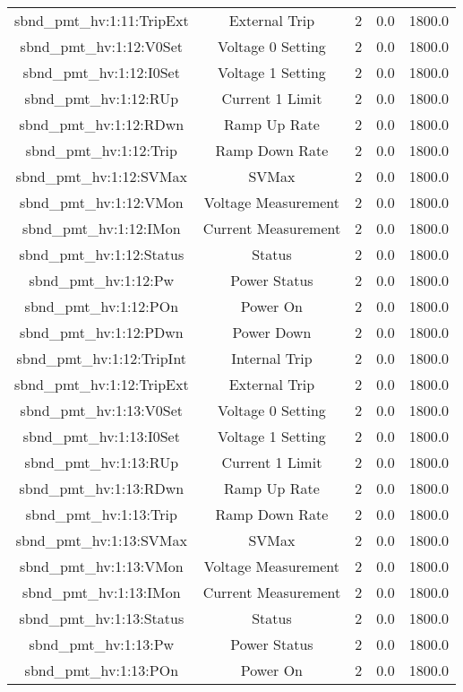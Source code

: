 \begin{center}
\begin{longtable}{c | c c c c }
sbnd\_pmt\_hv:1:11:TripExt & External Trip & 2 & 0.0 & 1800.0\\ 
sbnd\_pmt\_hv:1:12:V0Set & Voltage 0 Setting & 2 & 0.0 & 1800.0\\ 
sbnd\_pmt\_hv:1:12:I0Set & Voltage 1 Setting & 2 & 0.0 & 1800.0\\ 
sbnd\_pmt\_hv:1:12:RUp & Current 1 Limit & 2 & 0.0 & 1800.0\\ 
sbnd\_pmt\_hv:1:12:RDwn & Ramp Up Rate & 2 & 0.0 & 1800.0\\ 
sbnd\_pmt\_hv:1:12:Trip & Ramp Down Rate & 2 & 0.0 & 1800.0\\ 
sbnd\_pmt\_hv:1:12:SVMax & SVMax & 2 & 0.0 & 1800.0\\ 
sbnd\_pmt\_hv:1:12:VMon & Voltage Measurement & 2 & 0.0 & 1800.0\\ 
sbnd\_pmt\_hv:1:12:IMon & Current Measurement & 2 & 0.0 & 1800.0\\ 
sbnd\_pmt\_hv:1:12:Status & Status & 2 & 0.0 & 1800.0\\ 
sbnd\_pmt\_hv:1:12:Pw & Power Status & 2 & 0.0 & 1800.0\\ 
sbnd\_pmt\_hv:1:12:POn & Power On & 2 & 0.0 & 1800.0\\ 
sbnd\_pmt\_hv:1:12:PDwn & Power Down & 2 & 0.0 & 1800.0\\ 
sbnd\_pmt\_hv:1:12:TripInt & Internal Trip & 2 & 0.0 & 1800.0\\ 
sbnd\_pmt\_hv:1:12:TripExt & External Trip & 2 & 0.0 & 1800.0\\ 
sbnd\_pmt\_hv:1:13:V0Set & Voltage 0 Setting & 2 & 0.0 & 1800.0\\ 
sbnd\_pmt\_hv:1:13:I0Set & Voltage 1 Setting & 2 & 0.0 & 1800.0\\ 
sbnd\_pmt\_hv:1:13:RUp & Current 1 Limit & 2 & 0.0 & 1800.0\\ 
sbnd\_pmt\_hv:1:13:RDwn & Ramp Up Rate & 2 & 0.0 & 1800.0\\ 
sbnd\_pmt\_hv:1:13:Trip & Ramp Down Rate & 2 & 0.0 & 1800.0\\ 
sbnd\_pmt\_hv:1:13:SVMax & SVMax & 2 & 0.0 & 1800.0\\ 
sbnd\_pmt\_hv:1:13:VMon & Voltage Measurement & 2 & 0.0 & 1800.0\\ 
sbnd\_pmt\_hv:1:13:IMon & Current Measurement & 2 & 0.0 & 1800.0\\ 
sbnd\_pmt\_hv:1:13:Status & Status & 2 & 0.0 & 1800.0\\ 
sbnd\_pmt\_hv:1:13:Pw & Power Status & 2 & 0.0 & 1800.0\\ 
sbnd\_pmt\_hv:1:13:POn & Power On & 2 & 0.0 & 1800.0\\ 

\end{longtable}
\end{center}
